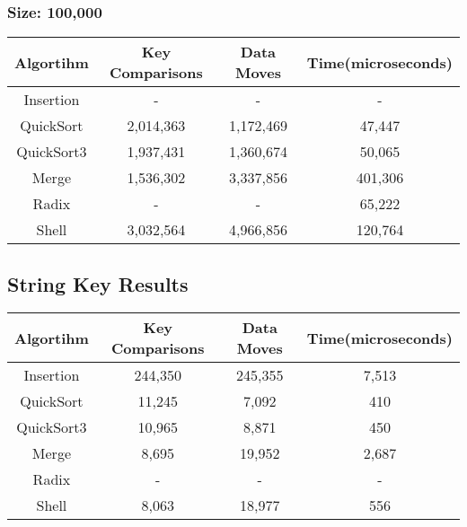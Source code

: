 \documentclass[titlepage]{article}
\begin{document}
\subsubsection{Size: 100,000}
\begin{tabular}{|*{4}{c|}}
    \hline
    Algortihm  & Key Comparisons & Data Moves & Time(microseconds) \\
    \hline
    Insertion  & -               & -          & -                  \\
    \hline
    QuickSort  & 2,014,363       & 1,172,469  & 47,447             \\
    \hline
    QuickSort3 & 1,937,431       & 1,360,674  & 50,065             \\
    \hline
    Merge      & 1,536,302       & 3,337,856  & 401,306            \\
    \hline
    Radix      & -               & -          & 65,222             \\
    \hline
    Shell      & 3,032,564       & 4,966,856  & 120,764            \\
    \hline
\end{tabular}
\subsection{String Key Results}
\begin{tabular}{|*{4}{c|}}
    \hline
    Algortihm  & Key Comparisons & Data Moves & Time(microseconds) \\
    \hline
    Insertion  & 244,350         & 245,355    & 7,513              \\
    \hline
    QuickSort  & 11,245          & 7,092      & 410                \\
    \hline
    QuickSort3 & 10,965          & 8,871      & 450                \\
    \hline
    Merge      & 8,695           & 19,952     & 2,687              \\
    \hline
    Radix      & -               & -          & -                  \\
    \hline
    Shell      & 8,063           & 18,977     & 556                \\
    \hline
\end{tabular}
\end{document}
